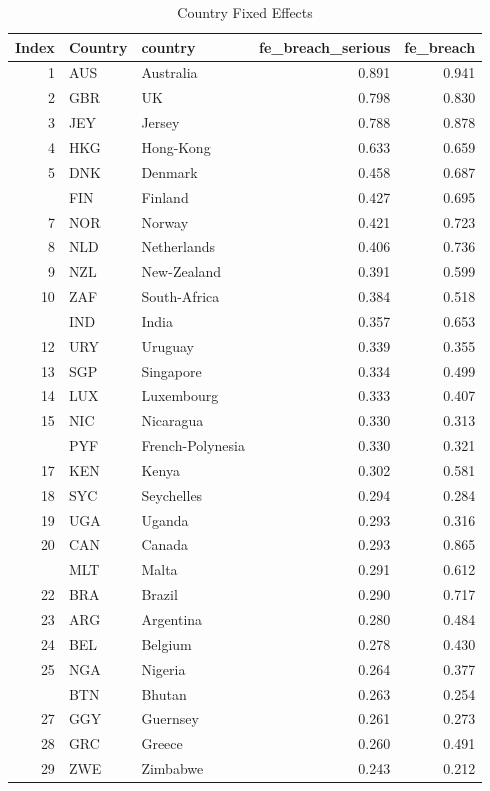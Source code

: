 \begin{table}
\centering
\caption{Country Fixed Effects}
\centering
\begin{tabular}[t]{rllrr}
\toprule
Index & Country & country & fe\_breach\_serious & fe\_breach\\
\midrule
1 & AUS & Australia & 0.891 & 0.941\\
2 & GBR & UK & 0.798 & 0.830\\
3 & JEY & Jersey & 0.788 & 0.878\\
4 & HKG & Hong-Kong & 0.633 & 0.659\\
5 & DNK & Denmark & 0.458 & 0.687\\
\addlinespace
6 & FIN & Finland & 0.427 & 0.695\\
7 & NOR & Norway & 0.421 & 0.723\\
8 & NLD & Netherlands & 0.406 & 0.736\\
9 & NZL & New-Zealand & 0.391 & 0.599\\
10 & ZAF & South-Africa & 0.384 & 0.518\\
\addlinespace
11 & IND & India & 0.357 & 0.653\\
12 & URY & Uruguay & 0.339 & 0.355\\
13 & SGP & Singapore & 0.334 & 0.499\\
14 & LUX & Luxembourg & 0.333 & 0.407\\
15 & NIC & Nicaragua & 0.330 & 0.313\\
\addlinespace
16 & PYF & French-Polynesia & 0.330 & 0.321\\
17 & KEN & Kenya & 0.302 & 0.581\\
18 & SYC & Seychelles & 0.294 & 0.284\\
19 & UGA & Uganda & 0.293 & 0.316\\
20 & CAN & Canada & 0.293 & 0.865\\
\addlinespace
21 & MLT & Malta & 0.291 & 0.612\\
22 & BRA & Brazil & 0.290 & 0.717\\
23 & ARG & Argentina & 0.280 & 0.484\\
24 & BEL & Belgium & 0.278 & 0.430\\
25 & NGA & Nigeria & 0.264 & 0.377\\
\addlinespace
26 & BTN & Bhutan & 0.263 & 0.254\\
27 & GGY & Guernsey & 0.261 & 0.273\\
28 & GRC & Greece & 0.260 & 0.491\\
29 & ZWE & Zimbabwe & 0.243 & 0.212\\

\end{tabular}
\end{table}
